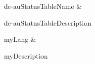 \hline

de-auStatusTableName
&

de-auStatusTableDescription
\\
\hline
\hline

myLang
&

myDescription
\\
\hline
